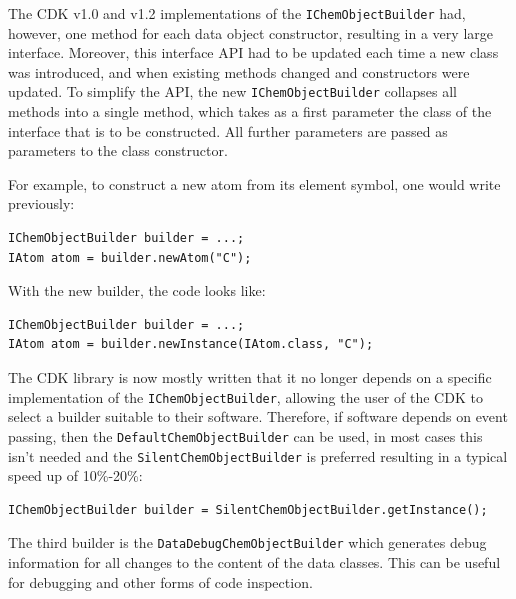 \documentclass[doublespacing]{bmcart}
\begin{document}
The CDK v1.0 and v1.2 implementations of the \texttt{IChemObjectBuilder} had,
however, one method for each data object constructor, resulting in a very large
interface. Moreover, this interface API had to be updated each time a new class
was introduced, and when existing methods changed and constructors were updated.
To simplify the API, the new \texttt{IChemObjectBuilder} collapses all methods
into a single method, which takes as a first parameter the class of the
interface that is to be constructed. All further parameters are passed as
parameters to the class constructor.

For example, to construct a new atom from its element symbol, one
would write previously:

\vspace{0.2cm}
\begin{verbatim}
IChemObjectBuilder builder = ...;
IAtom atom = builder.newAtom("C");
\end{verbatim}
\vspace{0.2cm}

With the new builder, the code looks like:

\vspace{0.2cm}
\begin{verbatim}
IChemObjectBuilder builder = ...;
IAtom atom = builder.newInstance(IAtom.class, "C");
\end{verbatim}
\vspace{0.2cm}

The CDK library is now mostly written that it no longer depends on a specific
implementation of the \texttt{IChemObjectBuilder}, allowing the user of the
CDK to select a builder suitable to their software. Therefore, if software
depends on event passing, then the \texttt{DefaultChemObjectBuilder} can be
used, in most cases this isn't needed and the \texttt{SilentChemObjectBuilder} 
is preferred resulting in a typical speed up of 10\%-20\%:

\vspace{0.2cm}
\begin{verbatim}
IChemObjectBuilder builder = SilentChemObjectBuilder.getInstance();
\end{verbatim}
\vspace{0.2cm}

The third builder is the \texttt{DataDebugChemObjectBuilder} which generates debug
information for all changes to the content of the data classes. This
can be useful for debugging and other forms of code inspection.
\end{document}

